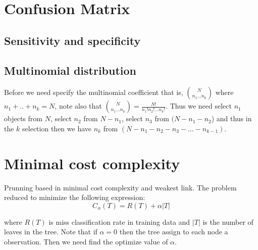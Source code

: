 \documentclass[10pt,a4paper]{article}
\begin{document}
\section{Confusion Matrix}

\subsection{Sensitivity and specificity}






\subsection{Multinomial distribution}

Before we need specify the multinomial  coefficient that is, 
$\binom{N}{n_{1}...n_{k}}$
where $n_{1}+..+n_{k} = N$, note also that $\binom{N}{n_{1}...n_{k}} = \frac{N!}{n_{1}!n_{2}!...n_{k}!}.$
Thus we need select $n_{1}$ objects from $N$, select $n_{2}$ from $N-n_{1}$, select $n_{3}$ from $(N-n_{1}-n_{2}$) and thus in the $k$ selection then we have $n_{k}$ from $ (N-n_{1}-n_{2}-n_{3}-...-n_{k-1})$.

\section{Minimal cost complexity}

Prunning based in minimal cost complexity and 
weakest link.
The problem reduced to minimize the following expression:
\begin{equation}
C_{\alpha}(T) = R(T) + \alpha \vert T \vert  
\label{minimalcost}  
\end{equation}

where $R(T)$ is miss classification rate in training data and $\vert T \vert$ is the number of leaves in the tree.
Note that if $\alpha = 0$ then the tree assign to each node a observation. Then we need find the optimize value of $\alpha$.
\end{document}
